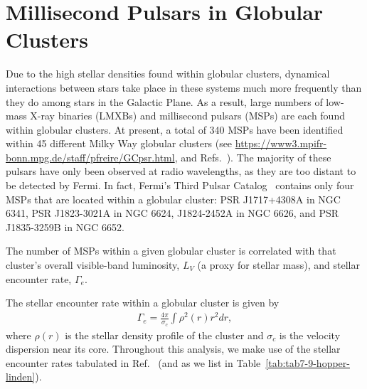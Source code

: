 \section{Millisecond Pulsars in Globular Clusters}
\label{sec:cases}

Due to the high stellar densities found within globular clusters, dynamical interactions between stars take place in these systems much more frequently than they do among stars in the Galactic Plane. As a result, large numbers of low-mass X-ray binaries (LMXBs) and millisecond pulsars (MSPs) are each found within globular clusters. At present, a total of 340 MSPs have been identified within 45 different Milky Way globular clusters (see \url{https://www3.mpifr-bonn.mpg.de/staff/pfreire/GCpsr.html}, and Refs.~\cite{Manchester:2004bp,Fermi-LAT:2023zzt}). The majority of these pulsars have only been observed at radio wavelengths, as they are too distant to be detected by Fermi. In fact, Fermi's Third Pulsar Catalog~\cite{Fermi-LAT:2023zzt} contains only four MSPs that are located within a globular cluster: 
%
PSR J1717+4308A in NGC 6341, PSR J1823-3021A in NGC 6624, J1824-2452A in NGC 6626, and PSR J1835-3259B in NGC 6652. 

The number of MSPs within a given globular cluster is correlated with that cluster's overall visible-band luminosity, $L_V$ (a proxy for stellar mass), and stellar encounter rate, $\Gamma_e$. 

\noindent
The stellar encounter rate within a globular cluster is given by~\cite{2003ASPC..296..245V,1987IAUS..125..187V}
%
\begin{align}
\Gamma_e = \frac{4\pi}{\sigma_c} \int \rho^2(r) r^2 dr,
\end{align}
%
where $\rho(r)$ is the stellar density profile of the cluster and $\sigma_c$ is the velocity dispersion near its core. Throughout this analysis, we make use of the stellar encounter rates tabulated in Ref.~\cite{Bahramian:2013ihw} (and as we list in Table~\ref{tab:tab7-9-hopper-linden}).

